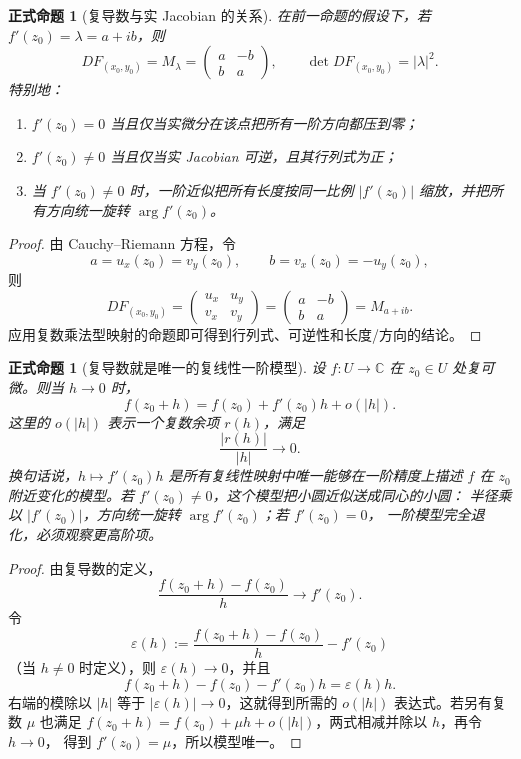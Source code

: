 \documentclass[UTF8,fontset=none,a4paper,11pt]{ctexart}
\theoremstyle{foundation-definition}
\theoremstyle{foundation-theorem}
\theoremstyle{foundation-proposition}
\newtheorem{proposition}[definition]{正式命题}
\theoremstyle{foundation-example}
\theoremstyle{foundation-remark}
\theoremstyle{foundation-theorem}
\begin{document}
\begin{proposition}[复导数与实 Jacobian 的关系]\label{prop:complex-jacobian-modulus}
在前一命题的假设下，若 \(f'(z_0)=\lambda=a+ib\)，则
\[
DF_{(x_0,y_0)}=M_\lambda
=\begin{pmatrix}a&-b\\ b&a\end{pmatrix},
\qquad
\det DF_{(x_0,y_0)}=|\lambda|^2.
\]
特别地：
\begin{enumerate}[label=(\alph*)]
  \item \(f'(z_0)=0\) 当且仅当实微分在该点把所有一阶方向都压到零；
  \item \(f'(z_0)\ne0\) 当且仅当实 Jacobian 可逆，且其行列式为正；
  \item 当 \(f'(z_0)\ne0\) 时，一阶近似把所有长度按同一比例
  \(|f'(z_0)|\) 缩放，并把所有方向统一旋转 \(\arg f'(z_0)\)。
\end{enumerate}
\end{proposition}

\begin{proof}
由 Cauchy--Riemann 方程，令
\[
a=u_x(z_0)=v_y(z_0),\qquad b=v_x(z_0)=-u_y(z_0),
\]
则
\[
DF_{(x_0,y_0)}
=\begin{pmatrix}u_x&u_y\\v_x&v_y\end{pmatrix}
=\begin{pmatrix}a&-b\\b&a\end{pmatrix}
=M_{a+ib}.
\]
应用复数乘法型映射的命题即可得到行列式、可逆性和长度/方向的结论。
\end{proof}

\begin{proposition}[复导数就是唯一的复线性一阶模型]\label{prop:complex-first-order-model}
设 \(f:U\to\mathbb C\) 在 \(z_0\in U\) 处复可微。则当 \(h\to0\) 时，
\[
  f(z_0+h)=f(z_0)+f'(z_0)h+o(|h|).
\]
这里的 \(o(|h|)\) 表示一个复数余项 \(r(h)\)，满足
\[
  \frac{|r(h)|}{|h|}\longrightarrow0.
\]
换句话说，\(h\mapsto f'(z_0)h\) 是所有复线性映射中唯一能够在一阶精度上描述
\(f\) 在 \(z_0\) 附近变化的模型。若 \(f'(z_0)\ne0\)，这个模型把小圆近似送成同心的小圆：
半径乘以 \(|f'(z_0)|\)，方向统一旋转 \(\arg f'(z_0)\)；若 \(f'(z_0)=0\)，
一阶模型完全退化，必须观察更高阶项。
\end{proposition}

\begin{proof}
由复导数的定义，
\[
  \frac{f(z_0+h)-f(z_0)}{h}\longrightarrow f'(z_0).
\]
令
\[
  \varepsilon(h):=
  \frac{f(z_0+h)-f(z_0)}{h}-f'(z_0)
\]
（当 \(h\ne0\) 时定义），则 \(\varepsilon(h)\to0\)，并且
\[
  f(z_0+h)-f(z_0)-f'(z_0)h=\varepsilon(h)h.
\]
右端的模除以 \(|h|\) 等于 \(|\varepsilon(h)|\to0\)，这就得到所需的
\(o(|h|)\) 表达式。若另有复数 \(\mu\) 也满足
\(f(z_0+h)=f(z_0)+\mu h+o(|h|)\)，两式相减并除以 \(h\)，再令 \(h\to0\)，
得到 \(f'(z_0)=\mu\)，所以模型唯一。
\end{proof}
\end{document}
